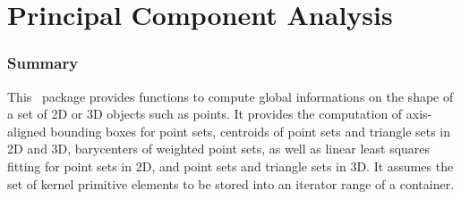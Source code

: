 
\chapter{Principal Component Analysis}
\label{ref_chapter_pca}


\subsection*{Summary}

This \cgal\ package provides functions to compute global informations
on the shape of a set of 2D or 3D objects such as points. It provides the computation of axis-aligned bounding boxes for point sets, centroids of point sets and triangle sets in 2D and 3D, barycenters of weighted point sets, as well as linear least squares fitting for point sets in 2D, and point sets and triangle sets in 3D. It assumes the set of kernel primitive elements to be stored into an iterator range of a container.



\\
\\
\\
\\
\\
\clearpage

